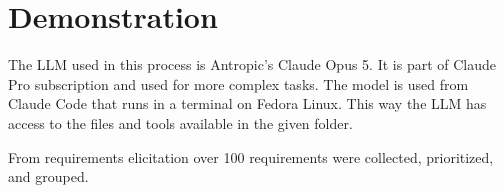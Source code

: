 \section{Demonstration}
The LLM used in this process is Antropic's Claude Opus 5. It is part of Claude Pro subscription and used for more complex tasks. The model is used from Claude Code that runs in a terminal on Fedora Linux. This way the LLM has access to the files and tools available in the given folder.

From requirements elicitation over 100 requirements were collected, prioritized, and grouped.
